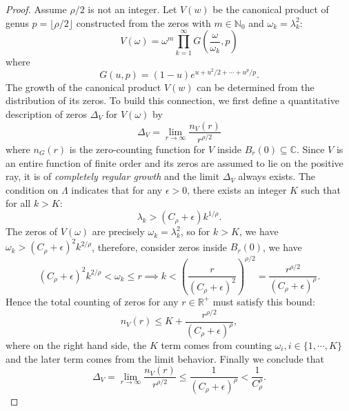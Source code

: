 \documentclass[graybox]{svmult}
\newcommand{\R}{\mathbb{R}}
\newcommand{\C}{\mathbb{C}}
\newcommand{\N}{\mathbb{N}}
\begin{document}
\begin{proof}
    Assume $\rho/2$ is not an integer. Let $V(w)$ be the canonical product of genus $p = \lfloor \rho/2 \rfloor$ constructed from the zeros with $m \in \N_0$ and $\omega_k = \lambda_k^2$:
    \begin{equation*}
        V(\omega) = \omega^m\prod_{k=1}^{\infty} G(\frac{\omega}{\omega_k},p)
    \end{equation*}
    where
    \begin{equation*}
        G(u,p)=(1-u)e^{u+ u^2/2 +\cdots +u^p/p}.
    \end{equation*}
    The growth of the canonical product $V(w)$ can be determined from the distribution of its zeros. To build this connection, we first define a quantitative description of zeros $\Delta_V$ for $V(\omega)$ by 
    \begin{equation*}
        \Delta_V = \lim_{r \to \infty}\frac{n_V(r)}{r^{\rho/2}}
    \end{equation*}
    where $n_G(r)$ is the zero-counting function for $V$ inside $B_r(0) \subseteq \C$. Since $V$ is an entire function of finite order and its zeros are assumed to lie on the positive ray, it is of \textit{completely regular growth} and the limit $\Delta_V$ always exists. The condition on $\Lambda$ indicates that for any $\epsilon > 0$, there exists an integer $K$ such that for all $k>K$:
    \begin{equation*}
        \lambda_k > (C_\rho + \epsilon)k^{1/\rho}.
    \end{equation*}
    The zeros of $V(\omega)$ are precisely $\omega_k = \lambda_k^2$, so for $k>K$, we have $\omega_k > (C_\rho + \epsilon)^2 k^{2/\rho}$, therefore, consider zeros inside $B_r(0)$, we have
    \begin{equation*}
        (C_\rho + \epsilon)^2 k^{2/\rho} < \omega_k \le r \implies k < \left(\frac{r}{(C_\rho + \epsilon)^2}\right)^{\rho/2} = \frac{r^{\rho/2}}{(C_\rho + \epsilon)^\rho}.
    \end{equation*}
    Hence the total counting of zeros for any $r \in \R^+$ must satisfy this bound:
    \begin{equation*}
        n_V(r) \le K + \frac{r^{\rho/2}}{(C_\rho+\epsilon)^\rho},
    \end{equation*}
    where on the right hand side, the $K$ term comes from counting $\omega_i, i \in \{ 1, \cdots, K\}$ and the later term comes from the limit behavior. Finally we conclude that 
    \begin{equation*}
        \Delta_V = \lim_{r \to \infty}\frac{n_V(r)}{r^{\rho/2}}\leq \frac{1}{(C_\rho+\epsilon)^\rho}<\frac{1}{C_\rho^\rho}.

\end{equation*}
\end{proof}
\end{document}
